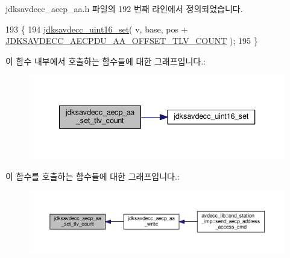 jdksavdecc\+\_\+aecp\+\_\+aa.\+h 파일의 192 번째 라인에서 정의되었습니다.


\begin{DoxyCode}
193 \{
194     \hyperlink{group__endian_ga14b9eeadc05f94334096c127c955a60b}{jdksavdecc\_uint16\_set}( v, base, pos + 
      \hyperlink{group___a_e_c_p___a_a__offsets_ga3365cbf982525053196ab7f3351abad1}{JDKSAVDECC\_AECPDU\_AA\_OFFSET\_TLV\_COUNT} );
195 \}
\end{DoxyCode}


이 함수 내부에서 호출하는 함수들에 대한 그래프입니다.\+:
\nopagebreak
\begin{figure}[H]
\begin{center}
\leavevmode
\includegraphics[width=340pt]{group___a_e_c_p___a_a_ga7e891867e553b3ff8e0e247629831afe_cgraph}
\end{center}
\end{figure}




이 함수를 호출하는 함수들에 대한 그래프입니다.\+:
\nopagebreak
\begin{figure}[H]
\begin{center}
\leavevmode
\includegraphics[width=350pt]{group___a_e_c_p___a_a_ga7e891867e553b3ff8e0e247629831afe_icgraph}
\end{center}
\end{figure}


